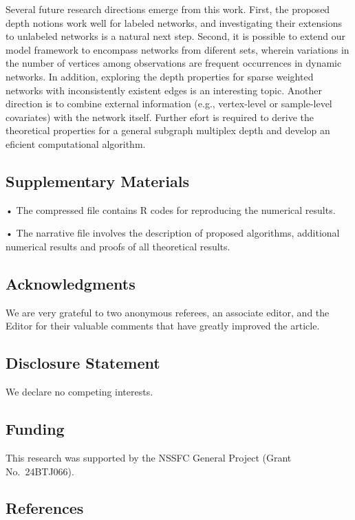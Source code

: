 \documentclass[
  10
]{article}
\begin{document}
Several future research directions emerge from this work. First, the
proposed depth notions work well for labeled networks, and investigating
their extensions to unlabeled networks is a natural next step. Second,
it is possible to extend our model framework to encompass networks from
diferent sets, wherein variations in the number of vertices among
observations are frequent occurrences in dynamic networks. In addition,
exploring the depth properties for sparse weighted networks with
inconsistently existent edges is an interesting topic. Another direction
is to combine external information (e.g., vertex-level or sample-level
covariates) with the network itself. Further efort is required to derive
the theoretical properties for a general subgraph multiplex depth and
develop an eficient computational algorithm.

\subsection{Supplementary Materials}\label{supplementary-materials}

• The compressed file contains R codes for reproducing the numerical
results.

• The narrative file involves the description of proposed algorithms,
additional numerical results and proofs of all theoretical results.

\subsection{Acknowledgments}\label{acknowledgments}

We are very grateful to two anonymous referees, an associate editor, and
the Editor for their valuable comments that have greatly improved the
article.

\subsection{Disclosure Statement}\label{disclosure-statement}

We declare no competing interests.

\subsection{Funding}\label{funding}

This research was supported by the NSSFC General Project (Grant
No.~24BTJ066).

\subsection{References}\label{references}
\end{document}
